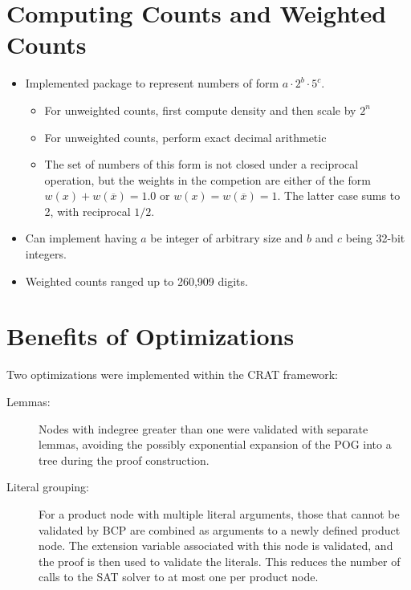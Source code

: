 \documentclass[letterpaper,USenglish,cleveref, autoref, thm-restate]{lipics-v2021}
\begin{document}
\section*{Computing Counts and Weighted Counts}

\begin{itemize}
\item Implemented package to represent numbers of form $a \cdot 2^b \cdot 5^c$.
  \begin{itemize}
  \item For unweighted counts, first compute density and then scale by $2^n$
  \item For unweighted counts, perform exact decimal arithmetic
  \item The set of numbers of this form is not closed under a reciprocal operation, but the weights in the competion are either of the form
    $w(x) + w(\overline{x}) = 1.0$ or $w(x) = w(\overline{x}) = 1$.  The latter case sums to 2, with reciprocal $1/2$.
  \end{itemize}
\item Can implement having $a$ be integer of arbitrary size and $b$ and $c$ being 32-bit integers.
\item Weighted counts ranged up to 260,909 digits.
\end{itemize}

\section*{Benefits of Optimizations}

Two optimizations were implemented within the CRAT framework:
\begin{description}
\item[Lemmas:] Nodes with indegree greater than one were validated with separate lemmas, avoiding the possibly exponential expansion of the POG into a tree during the proof construction.

\item[Literal grouping:] For a product node with multiple literal
  arguments, those that cannot be validated by BCP are combined as
  arguments to a newly defined product node.  The extension variable
  associated with this node is validated, and the proof is then used
  to validate the literals.  This reduces the number of
  calls to the SAT solver to at most one per product node.
\end{description}
\end{document}
